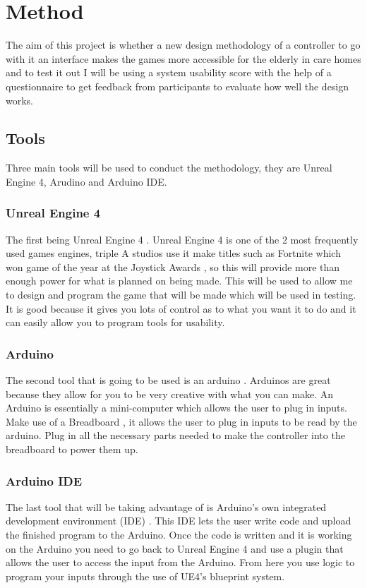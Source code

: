 \documentclass[journal]{IEEEtran}
\begin{document}
\section{Method}
The aim of this project is whether a new design methodology of a controller to go with it an interface makes the games more accessible for the elderly in care homes and to test it out I will be using a system usability score with the help of a questionnaire to get feedback from participants to evaluate how well the design works.
\subsection{Tools}
Three main tools will be used to conduct the methodology, they are Unreal Engine 4, Arudino and Arduino IDE.
\subsubsection{Unreal Engine 4}
The first being Unreal Engine 4 \cite{noauthor_what_nodate}. Unreal Engine 4 is one of the 2 most frequently used games engines, triple A studios use it make titles such as Fortnite \cite{noauthor_fortnite_2018} which won game of the year at the Joystick Awards \cite{noauthor_fortnite_2018-1}, so this will provide more than enough power for what is planned on being made. This will be used to allow me to design and program the game that will be made which will be used in testing. It is good because it gives you lots of control as to what you want it to do and it can easily allow you to program tools for usability. 
\subsubsection{Arduino}
The second tool that is going to be used is an arduino \cite{noauthor_arduino_2018}. Arduinos are great because they allow for you to be very creative with what you can make. An Arduino is essentially a mini-computer which allows the user to plug in inputs. Make use of a Breadboard \cite{noauthor_breadboard_2018}, it allows the user to plug in inputs to be read by the arduino. Plug in all the necessary parts needed to make the controller into the breadboard to power them up.
\subsubsection{Arduino IDE}
The last tool that will be taking advantage of is Arduino's own integrated development environment (IDE) \cite{noauthor_arduino_2017}. This IDE lets the user write code and upload the finished program to the Arduino. Once the code is written and it is working on the Arduino you need to go back to Unreal Engine 4 and use a plugin that allows the user to access the input from the Arduino. From here you use logic to program your inputs through the use of UE4's blueprint system.
\end{document}
